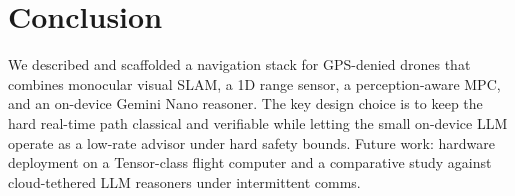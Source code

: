 \section{Conclusion}
\label{sec:conclusion}

We described and scaffolded a navigation stack for GPS-denied drones
that combines monocular visual SLAM, a 1D range sensor, a
perception-aware MPC, and an on-device Gemini Nano reasoner. The key
design choice is to keep the hard real-time path classical and
verifiable while letting the small on-device LLM operate as a low-rate
advisor under hard safety bounds. Future work: hardware deployment on a
Tensor-class flight computer and a comparative study against
cloud-tethered LLM reasoners under intermittent comms.

